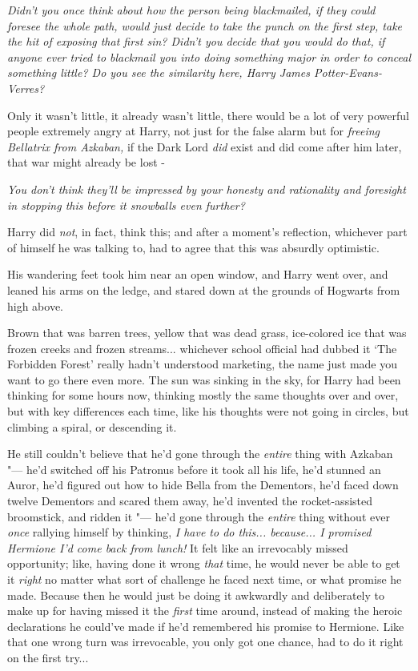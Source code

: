 \emph{Didn't you once think about how the person being blackmailed, if
they could foresee the whole path, would just decide to take the punch
on the first step, take the hit of exposing that first sin? Didn't you
decide that you would do that, if anyone ever tried to blackmail you
into doing something major in order to conceal something little? Do you
see the similarity here, Harry James Potter-Evans-Verres?}

Only it wasn't little, it already wasn't little, there would be a lot of
very powerful people extremely angry at Harry, not just for the false
alarm but for \emph{freeing Bellatrix from Azkaban,} if the Dark Lord
\emph{did} exist and did come after him later, that war might already be
lost -

\emph{You don't think they'll be impressed by your honesty and
rationality and foresight in stopping this before it snowballs even
further?}

Harry did \emph{not}, in fact, think this; and after a moment's
reflection, whichever part of himself he was talking to, had to agree
that this was absurdly optimistic.

His wandering feet took him near an open window, and Harry went over,
and leaned his arms on the ledge, and stared down at the grounds of
Hogwarts from high above.

Brown that was barren trees, yellow that was dead grass, ice-colored ice
that was frozen creeks and frozen streams... whichever school
official had dubbed it `The Forbidden Forest' really hadn't understood
marketing, the name just made you want to go there even more. The sun
was sinking in the sky, for Harry had been thinking for some hours now,
thinking mostly the same thoughts over and over, but with key
differences each time, like his thoughts were not going in circles, but
climbing a spiral, or descending it.

He still couldn't believe that he'd gone through the \emph{entire} thing
with Azkaban "--- he'd switched off his Patronus before it took all his
life, he'd stunned an Auror, he'd figured out how to hide Bella from the
Dementors, he'd faced down twelve Dementors and scared them away, he'd
invented the rocket-assisted broomstick, and ridden it "--- he'd gone
through the \emph{entire} thing without ever \emph{once} rallying
himself by thinking, \emph{I have to do this... because... I
promised Hermione I'd come back from lunch!} It felt like an irrevocably
missed opportunity; like, having done it wrong \emph{that} time, he
would never be able to get it \emph{right} no matter what sort of
challenge he faced next time, or what promise he made. Because then he
would just be doing it awkwardly and deliberately to make up for having
missed it the \emph{first} time around, instead of making the heroic
declarations he could've made if he'd remembered his promise to
Hermione. Like that one wrong turn was irrevocable, you only got one
chance, had to do it right on the first try...

